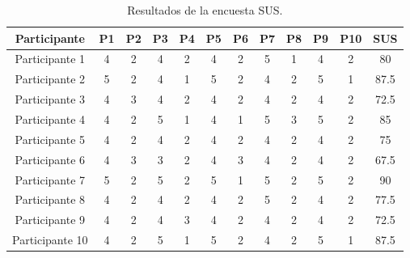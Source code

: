 \begin{table}[H]
    \centering
    \caption{Resultados de la encuesta SUS.}
    \label{tab:resultadosSUS}
    \begin{tabular}{|c|c|c|c|c|c|c|c|c|c|c|c|}
        \hline
        \rowcolor{gray!50}
        \textbf{Participante} & \textbf{P1} & \textbf{P2} & \textbf{P3} & \textbf{P4} & \textbf{P5} & \textbf{P6} & \textbf{P7} & \textbf{P8} & \textbf{P9} & \textbf{P10} & \textbf{SUS} \\
        \hline
        Participante 1 & 4 & 2 & 4 & 2 & 4 & 2 & 5 & 1 & 4 & 2 & 80 \\
        \hline
        Participante 2 & 5 & 2 & 4 & 1 & 5 & 2 & 4 & 2 & 5 & 1 & 87.5 \\
        \hline
        Participante 3 & 4 & 3 & 4 & 2 & 4 & 2 & 4 & 2 & 4 & 2 & 72.5 \\
        \hline
        Participante 4 & 4 & 2 & 5 & 1 & 4 & 1 & 5 & 3 & 5 & 2 & 85 \\
        \hline
        Participante 5 & 4 & 2 & 4 & 2 & 4 & 2 & 4 & 2 & 4 & 2 & 75 \\
        \hline
        Participante 6 & 4 & 3 & 3 & 2 & 4 & 3 & 4 & 2 & 4 & 2 & 67.5 \\
        \hline
        Participante 7 & 5 & 2 & 5 & 2 & 5 & 1 & 5 & 2 & 5 & 2 & 90 \\
        \hline
        Participante 8 & 4 & 2 & 4 & 2 & 4 & 2 & 5 & 2 & 4 & 2 & 77.5 \\
        \hline
        Participante 9 & 4 & 2 & 4 & 3 & 4 & 2 & 4 & 2 & 4 & 2 & 72.5 \\
        \hline
        Participante 10 & 4 & 2 & 5 & 1 & 5 & 2 & 4 & 2 & 5 & 1 & 87.5 \\
        \hline
        
    \end{tabular}
\end{table}